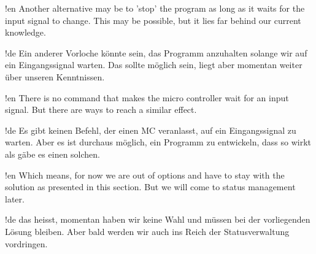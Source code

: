 !en Another alternative may be to 'stop' the program as long as it waits for the input signal to change. This may be possible, but it lies far behind our current knowledge.

!de Ein anderer Vorloche könnte sein, das Programm anzuhalten solange wir auf ein Eingangssignal warten. Das sollte möglich sein, liegt aber momentan weiter über unseren Kenntnissen.



!en There is no command that makes the micro controller wait for an input signal. But there are ways to reach a similar effect.

!de Es gibt keinen Befehl, der einen MC veranlasst, auf ein Eingangssignal zu warten. Aber es ist durchaus möglich, ein Programm zu entwickeln, dass so wirkt als gäbe es einen solchen.



!en Which means, for now we are out of options and have to stay with the solution as presented in this section. But we will come to status management later.

!de das heisst, momentan haben wir keine Wahl und müssen bei der vorliegenden Lösung bleiben. Aber bald werden wir auch ins Reich der Statusverwaltung vordringen.
